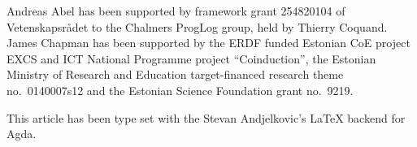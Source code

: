 \documentclass[preliminary,copyright,creativecommons]{eptcs}
\begin{document}
Andreas Abel has been supported by framework grant 254820104
of Vetenskapsr\aa{}det
to the Chalmers ProgLog group, held by Thierry Coquand.
James Chapman has been supported by the ERDF funded Estonian CoE project EXCS
and ICT National Programme project “Coinduction”, the Estonian
Ministry of Research and Education target-financed research theme
no.~0140007s12 and the Estonian Science Foundation grant no.~9219.

This article has been type set with the Stevan Andjelkovic's LaTeX backend for Agda.



\end{document}
